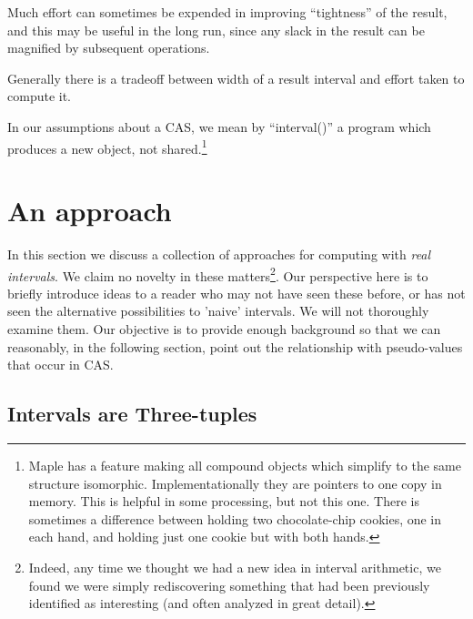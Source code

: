 \documentclass{article}
\begin{document}
Much effort can sometimes be expended in improving ``tightness'' of the
result, and this may be useful in the long run, since any slack in the result can be magnified by subsequent
operations.

Generally there is a tradeoff between width of a result interval and
effort taken to compute it.

In our assumptions about a CAS, we mean by ``interval()'' a program
which produces a new object, not shared.\footnote{Maple has a feature
making all compound objects which simplify to the same structure
isomorphic. Implementationally they are pointers to one copy in
memory. This is helpful in some processing, but not this one.  There
is sometimes a difference between holding two chocolate-chip cookies,
one in each hand, and holding just one cookie but with both hands.}

\section{An approach}
In this section we discuss a collection of approaches for computing
with {\em real intervals}. We claim no novelty in these
matters\footnote{Indeed, any time we thought we had a new idea in
interval arithmetic, we found we were simply rediscovering something
that had been previously identified as interesting (and often analyzed
in great detail).}.  Our perspective here is to briefly introduce
ideas to a reader who may not have seen these before, or has not seen the
alternative possibilities to 'naive' intervals.  We will not
thoroughly examine them. Our objective is to provide enough background
so that we can reasonably, in the following section, point out the
relationship with pseudo-values that occur in CAS.
\subsection{Intervals are Three-tuples}
\end{document}
